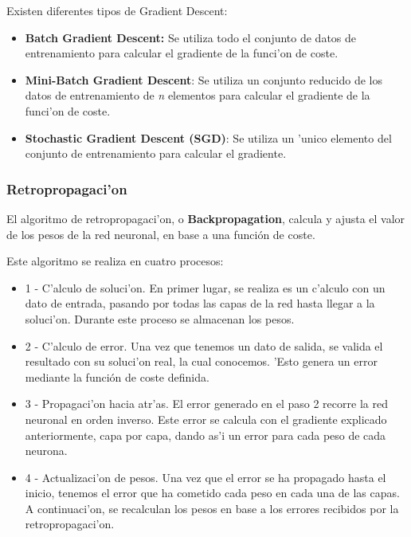 Existen diferentes tipos de Gradient Descent:
\begin{itemize}
\item \textbf{Batch Gradient Descent:} Se utiliza todo el conjunto de datos de entrenamiento para calcular el gradiente de la funci'on de coste. 
\item \textbf{Mini-Batch Gradient Descent}: Se utiliza un conjunto reducido de los datos de entrenamiento de \textit{n} elementos para calcular el gradiente de la funci'on de coste. 
\item \textbf{Stochastic Gradient Descent (SGD)}: Se utiliza un 'unico elemento del conjunto de entrenamiento para calcular el gradiente. 
\end{itemize}





\clearpage

\subsubsection{Retropropagaci'on}

El algoritmo de retropropagaci'on, o \textbf{Backpropagation}, calcula y ajusta el valor de los pesos de la red neuronal, en base a una función de coste.

Este algoritmo se realiza en cuatro procesos:
\begin{itemize}
\item 1 - C'alculo de soluci'on. En primer lugar, se realiza es un c'alculo con un dato de entrada, pasando por todas las capas de la red hasta llegar a la soluci'on. Durante este proceso se almacenan los pesos.

\item 2 - C'alculo de error. Una vez que tenemos un dato de salida, se valida el resultado con su soluci'on real, la cual conocemos. 'Esto genera un error mediante la función de coste definida.

\item 3 - Propagaci'on hacia atr'as. El error generado en el paso 2 recorre la red neuronal en orden inverso. Este error se calcula con el gradiente explicado anteriormente, capa por capa, dando as'i un error para cada peso de cada neurona. 

\item 4 - Actualizaci'on de pesos. Una vez que el error se ha propagado hasta el inicio, tenemos el error que ha cometido cada peso en cada una de las capas. A continuaci'on, se recalculan los pesos en base a los errores recibidos por la retropropagaci'on. 
\end{itemize}


